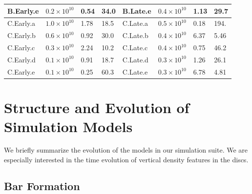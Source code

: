 \begin{table}
\begin{tabular}{|l l l l | l l l l|}
	B.Early.e & $0.2 \times 10^{10}$ & 0.54 & 34.0 & B.Late.e & $0.4 \times 10^{10}$ & 1.13 & 29.7 \\
	\hline
    C.Early.a & $1.0 \times 10^{10}$ & 1.78 & 18.5 & C.Late.a & $0.5 \times 10^{10}$ & 0.18 & 194. \\
	C.Early.b & $0.6 \times 10^{10}$ & 0.92 & 30.0 & C.Late.b & $0.4 \times 10^{10}$ & 6.37 & 5.46 \\
	C.Early.c & $0.3 \times 10^{10}$ & 2.24 & 10.2 & C.Late.c & $0.4 \times 10^{10}$ & 0.75 & 46.2 \\
	C.Early.d & $0.1 \times 10^{10}$ & 0.91 & 18.7 & C.Late.d & $0.3 \times 10^{10}$ & 1.26 & 26.1 \\
	C.Early.e & $0.1 \times 10^{10}$ & 0.25 & 60.3 & C.Late.e & $0.3 \times 10^{10}$ & 6.78 & 4.81 \\
	\hline
	\end{tabular}
\end{table}



\section{Structure and Evolution of Simulation Models} \label{sec:evolution}

We briefly summarize the evolution of the models in our simulation suite. We are especially interested in the time evolution of vertical density features in the discs.



\subsection{Bar Formation}


